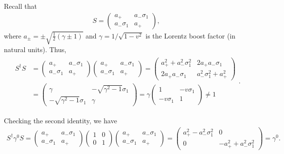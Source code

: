 Recall that 
\begin{eqnarray}
    \label{eq:S-mat}
    S = \begin{pmatrix}
        a_{+} & a_{-}\sigma_1 \\
        a_{-}\sigma_1 & a_{+}
    \end{pmatrix}   
,\end{eqnarray}
where $a_{\pm} = \pm \sqrt{\frac{1}{2}(\gamma \pm 1)}$ and $\gamma = 1/\sqrt{1 - v^2}$ is the Lorentz boost factor (in natural units).
Thus,
\begin{eqnarray}
    \label{eq:SdaggerS}
    \begin{aligned}    
        S^{\dagger} S &= \begin{pmatrix}
        a_{+} & a_{-} \sigma_1 \\
        a_{-} \sigma_1 & a_{+}
    \end{pmatrix}
    \begin{pmatrix}
        a_{+} & a_{-} \sigma_1 \\
        a_{-} \sigma_1 & a_{+}
    \end{pmatrix}
    = 
    \begin{pmatrix}
        a_{+}^2 + a_{-}^2 \sigma_1^2 & 2 a_{+}a_{-} \sigma_1 \\
        2 a_{+}a_{-} \sigma_1 & a_{-}^2 \sigma_1^2 + a_{+}^2
    \end{pmatrix} 
    \\
                      &=
    \begin{pmatrix}
        \gamma & -\sqrt{\gamma^2 - 1} \sigma_1 \\
        -\sqrt{\gamma^2 - 1}\sigma_1 & \gamma
    \end{pmatrix}
    =
    \gamma
    \begin{pmatrix}
        1 & -v \sigma_1 \\
        -v \sigma_1 & 1
    \end{pmatrix} 
    \ne 1
    \end{aligned}
.\end{eqnarray}

Checking the second identity, we have
\begin{eqnarray}
    \label{eq:Sdagger-gamma0-S}
    S^{\dagger} \gamma^{0} S = 
    \begin{pmatrix}
        a_{+} & a_{-} \sigma_1 \\
        a_{-} \sigma_1 & a_{+}
    \end{pmatrix}
    \begin{pmatrix}
        1 & 0 \\
        0 & 1
    \end{pmatrix}
    \begin{pmatrix}
        a_{+} & a_{-} \sigma_1 \\
        a_{-} \sigma_1 & a_{+}
    \end{pmatrix}
    =
    \begin{pmatrix}
    a_{+}^2 - a_{-}^2\sigma_1^2 & 0 \\
    0 & -a_{+}^2 + a_{-}^2\sigma_1^2
    \end{pmatrix} 
    = \gamma^{0}
.\end{eqnarray}



